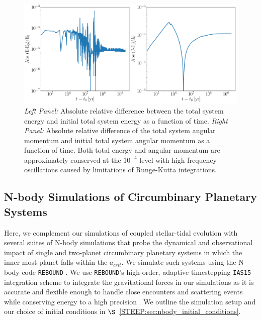 \begin{figure}
	\includegraphics[width=\textwidth]{conservation.pdf}
    \caption{{\it Left Panel:} Absolute relative difference between the total system energy and initial total system energy as a function of time.  {\it Right Panel:} Absolute relative difference of the total system angular momentum and initial total system angular momentum as a function of time.  Both total energy and angular momentum are approximately conserved at the $10^{-4}$ level with high frequency oscillations caused by limitations of Runge-Kutta integrations.}
    \label{STEEP:fig:conservation}
\end{figure}


\subsection{N-body Simulations of Circumbinary Planetary Systems} \label{STEEP:sec:nbody_methods}

Here, we complement our \vplanet simulations of coupled stellar-tidal evolution with several suites of N-body simulations that probe the dynamical and observational impact of single and two-planet circumbinary planetary systems in which the inner-most planet falls within the $a_{crit}$.  We simulate such systems using the N-body code \texttt{REBOUND} \citep{Rein2012}.  We use \texttt{REBOUND}'s high-order, adaptive timestepping \texttt{IAS15} integration scheme to integrate the gravitational forces in our simulations as it is accurate and flexible enough to handle close encounters and scattering events while conserving energy to a high precision \citep{Rein2015}.  We outline the simulation setup and our choice of initial conditions in $\S$~\ref{STEEP:sec:nbody_initial_conditions}.

